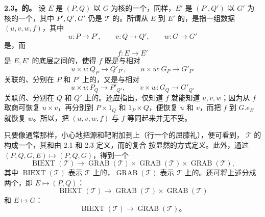 \textbf{2.3。的。} 设 $E$ 是 $(P,Q)$ 以 $G$ 为核的一个，同样，$E'$ 是 $(P',Q')$ 以 $G'$ 为核的一个，其中 $P',Q',G'$ 仍是 $\mathcal T$ 的。所谓从 $E$ 到 $E'$ 的，是指一组数据 $(u,v,w,f)$，其中
\[
u:P\longrightarrow P',\qquad v:Q\longrightarrow Q',\qquad w:G\longrightarrow G'\tag{2.3.1}
\]
是，而
\[
f:E\longrightarrow E'\tag{2.3.2}
\]
是 $E,E'$ 的底层之间的，使得 $f$ 既是与相对
\[
u\times v:Q_P\longrightarrow Q'_{P'},\qquad u\times w:G_P\longrightarrow G'_{P'}
\]
关联的、分别在 $P$ 和 $P'$ 上的，又是与相对
\[
u\times v:P_Q\longrightarrow P'_{Q'},\qquad v\times w:G_Q\longrightarrow G'_{Q'}
\]
关联的、分别在 $Q$ 和 $Q'$ 上的。还应指出，仅知道 $f$ 就能知道 $u,v,w$；因为从 $f$ 取商可恢复 $u\times v$，再分别到 $P\times1_Q$ 和 $1_P\times Q$，便恢复 $u$ 和 $v$，而把 $f$ 到 $G.e_E$ 就恢复 $w$。所以，把 $(u,v,w,f)$ 与 $f$ 等同起来并无不妥。

只要像通常那样，小心地把源和靶附加到上（行一个的屈膝礼），便可看到， $\mathcal T$ 的构成一个，其和由 2.1 和 2.3 定义，而的复合
按显然的方式定义。此外，通过 $(P,Q,G,E)\mapsto(P,Q,G)$，得到一个
\[
\operatorname{BIEXT}(\mathcal T)\longrightarrow\operatorname{GRAB}(\mathcal T)\times\operatorname{GRAB}(\mathcal T)\times\operatorname{GRAB}(\mathcal T),\tag{2.3.3}
\]
其中 $\operatorname{BIEXT}(\mathcal T)$ 表示 $\mathcal T$ 上的，$\operatorname{GRAB}(\mathcal T)$ 表示 $\mathcal T$ 上的。还可将上述分成两个，即 $E\mapsto(P,Q)$：
\[
\operatorname{BIEXT}(\mathcal T)\longrightarrow\operatorname{GRAB}(\mathcal T)\times\operatorname{GRAB}(\mathcal T)\tag{2.3.4}
\]
和 $E\mapsto G$：
\[
\operatorname{BIEXT}(\mathcal T)\longrightarrow\operatorname{GRAB}(\mathcal T)。\tag{2.3.5}
\]

